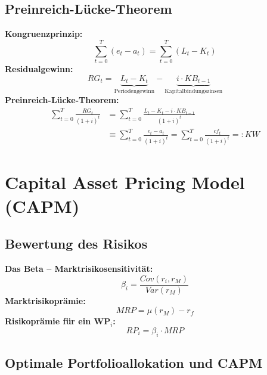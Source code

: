 \documentclass[leqno]{scrartcl}
\begin{document}
\begin{multicols}{4}
  
  

\subsection{Preinreich-Lücke-Theorem}

\textbf{Kongruenzprinzip:}
  \begin{equation*}\label{Kongruenzprinzip}
    \sum^{T}_{t=0} (e_t-a_t) = \sum^{T}_{t=0} (L_t-K_t)
  \end{equation*}
\textbf{Residualgewinn:}
  \begin{equation*}\label{Residualgewinn}
    RG_t=\underbrace{L_t-K_t}_\text{Periodengewinn}-\underbrace{i \cdot KB_{t-1}}_\text{Kapitalbindungszinsen}
  \end{equation*}
\textbf{Preinreich-Lücke-Theorem:}
  \begin{equation*}
    \begin{split}
      \sum^{T}_{t=0} \frac{RG_t}{(1+i)^t} 
        &= \sum^{T}_{t=0} \frac{L_t - K_t - i \cdot KB_{t-1}}{(1+i)^t}\\
        &\equiv \sum^{T}_{t=0} \frac{e_t - a_t}{(1+i)^t}
        = \sum^{T}_{t=0} \frac{cf_t}{(1+i)^t}
        =: KW
    \end{split}
  \end{equation*}


\section{Capital Asset Pricing Model (CAPM)}

\subsection{Bewertung des Risikos}
  \textbf{Das Beta – Marktrisikosensitivität:}
    \begin{equation*}
      \beta_i = \frac{Cov(r_i ,r_M)}{Var(r_M)}
    \end{equation*}
  \textbf{Marktrisikoprämie:}
    \begin{equation*}
      MRP = \mu(r_M) -r_f
    \end{equation*}
  \textbf{Risikoprämie für ein WP$_i$:}
    \begin{equation*}
      RP_i = \beta_i \cdot MRP
    \end{equation*}

\subsection{Optimale Portfolioallokation und CAPM}


\end{multicols}
\end{document}
